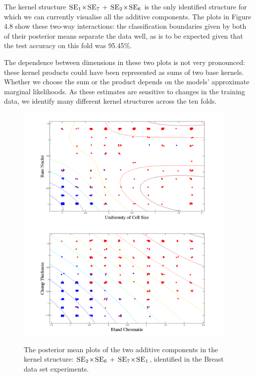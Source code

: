 \documentclass[a4paper,12pt ]{report}
\newcommand{\kerntimes}{ \! \times \!}
\newcommand{\kernplus}{ \, + \,}
\begin{document}
The kernel structure $\SE_1 \kerntimes \SE_7 \kernplus \SE_2 \kerntimes \SE_6 $ is the only identified structure for which we can currently visualise all the additive components. The plots in Figure 4.8 show these two-way interactions: the classification boundaries given by both of their posterior means separate the data well, as is to be expected given that the test accuracy on this fold was 95.45\%.

The dependence between dimensions in these two plots is not very pronounced: these kernel products could have been represented as sums of two base kernels. Whether we choose the sum or the product depends on the models' approximate marginal likelihoods. As these estimates are sensitive to changes in the training data, we identify many different kernel structures across the ten folds. \\

\begin{figure} [h]

\caption{The posterior mean plots of the two additive components in the kernel structure: $ \SE_2 \kerntimes \SE_6 \kernplus \SE_7 \kerntimes \SE_1 $, identified in the Breast data set experiments.}

\begin{center}

\includegraphics[trim=0cm 0cm 0cm 0cm, width=0.95\textwidth]{figures/breast/nucleicellsize.png} %
\includegraphics[trim=0cm 0cm 0cm 0cm, width=0.95\textwidth]{figures/breast/clumpbland.png} %

\end{center}

\end{figure}
\end{document}
